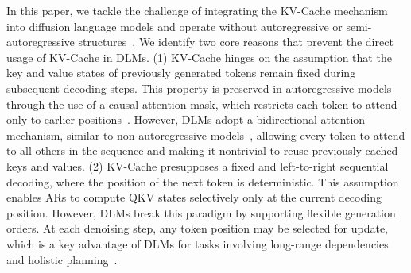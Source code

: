 \documentclass{article}
\begin{document}
In this paper, we tackle the challenge of integrating the KV-Cache mechanism into diffusion language models and operate without autoregressive or semi-autoregressive structures~\cite{arriola2025block}. We identify two core reasons that prevent the direct usage of KV-Cache in DLMs. 
(1) KV-Cache hinges on the assumption that the key and value states of previously generated tokens remain fixed during subsequent decoding steps. This property is preserved in autoregressive models through the use of a causal attention mask, which restricts each token to attend only to earlier positions~\cite{Dai2019TransformerXLAL}. However, DLMs adopt a bidirectional attention mechanism, similar to non-autoregressive models~\cite{gu2017non}, allowing every token to attend to all others in the sequence and making it nontrivial to reuse previously cached keys and values.
(2) KV-Cache presupposes a fixed and left-to-right sequential decoding, where the position of the next token is deterministic. This assumption enables ARs to compute QKV states selectively only at the current decoding position. However, DLMs break this paradigm by supporting flexible generation orders. At each denoising step, any token position may be selected for update, which is a key advantage of DLMs for tasks involving long-range dependencies and holistic planning~\cite{Ye2025ImplicitSV}. 
\end{document}
